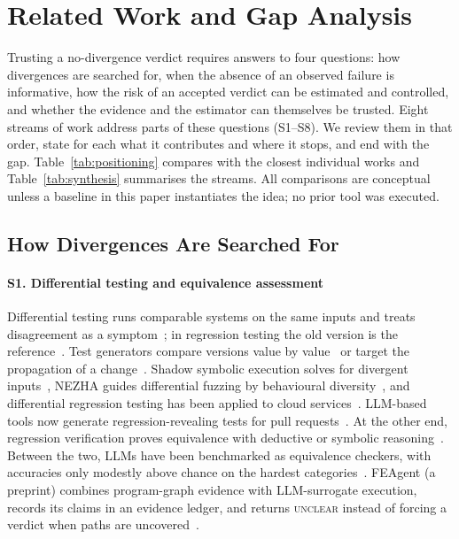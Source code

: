 \section{Related Work and Gap Analysis}\label{sec:background}

Trusting a no-divergence verdict requires answers to four questions: how divergences are searched for, when the absence of an observed failure is informative, how the risk of an accepted verdict can be estimated and controlled, and whether the evidence and the estimator can themselves be trusted. Eight streams of work address parts of these questions (S1--S8). We review them in that order, state for each what it contributes and where it stops, and end with the gap. Table~\ref{tab:positioning} compares \sbg{} with the closest individual works and Table~\ref{tab:synthesis} summarises the streams. All comparisons are conceptual unless a baseline in this paper instantiates the idea; no prior tool was executed.

\subsection{How Divergences Are Searched For}
\paragraph*{S1. Differential testing and equivalence assessment} Differential testing runs comparable systems on the same inputs and treats disagreement as a symptom~\cite{mckeeman1998differential}; in regression testing the old version is the reference~\cite{evans2007differential}. Test generators compare versions value by value~\cite{jin2010automated,taneja2008diffgen} or target the propagation of a change~\cite{santelices2008testsuite}. Shadow symbolic execution solves for divergent inputs~\cite{cadar2014shadow,palikareva2016shadow,kuchta2018shadow}, NEZHA guides differential fuzzing by behavioural diversity~\cite{petsios2017nezha}, and differential regression testing has been applied to cloud services~\cite{godefroid2020differential}. LLM-based tools now generate regression-revealing tests for pull requests~\cite{pradel2026testora,hu2026difftestgen,lecong2026patchguru,fu2026orion,etemadi2025mokav,liu2026evaluating,schafer2024empirical}. At the other end, regression verification proves equivalence with deductive or symbolic reasoning~\cite{godlin2009regression,lahiri2012symdiff,felsing2014automating,malik2021automatically}. Between the two, LLMs have been benchmarked as equivalence checkers, with accuracies only modestly above chance on the hardest categories~\cite{wei2025equibench}. FEAgent (a preprint) combines program-graph evidence with LLM-surrogate execution, records its claims in an evidence ledger, and returns \textsc{unclear} instead of forcing a verdict when paths are uncovered~\cite{kachroo2026feagent}.

